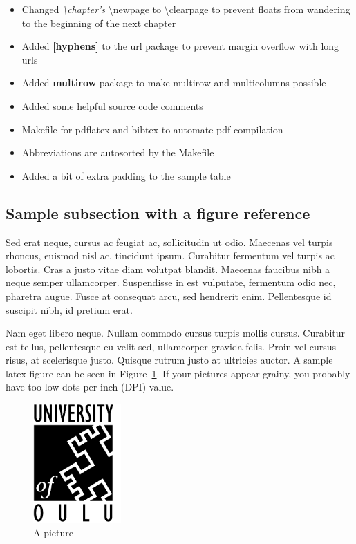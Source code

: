 \begin{itemize}
\item Changed \textit{\textbackslash{chapter's}} \textbackslash{newpage} to 
\textbackslash{clearpage} to prevent floats from wandering to the beginning of the next chapter

\item Added \textbf{[hyphens]} to the url package to prevent margin overflow with 
long urls

\item Added \textbf{multirow} package to make multirow and multicolumns possible

\item Added some helpful source code comments

\item Makefile for pdflatex and bibtex to automate pdf compilation

\item Abbreviations are autosorted by the Makefile

\item Added a bit of extra padding to the sample table
\end{itemize}

\subsection{Sample subsection with a figure reference}

Sed erat neque, cursus ac feugiat ac, sollicitudin
ut odio. Maecenas vel turpis rhoncus, euismod nisl ac, tincidunt ipsum. Curabitur fermentum vel
turpis ac lobortis. Cras a justo vitae diam volutpat blandit. Maecenas faucibus nibh a neque 
semper ullamcorper. Suspendisse in est vulputate, fermentum odio nec, pharetra augue. Fusce at
consequat arcu, sed hendrerit enim. Pellentesque id suscipit nibh, id pretium erat. 

Nam eget libero neque. Nullam commodo cursus turpis mollis cursus. Curabitur est tellus,
pellentesque eu velit sed, ullamcorper gravida felis. Proin vel cursus risus, at scelerisque 
justo. Quisque rutrum justo at ultricies auctor. A sample latex figure can be seen in
Figure~\ref{fig:oylogoe}. If your pictures appear grainy, you probably have too low dots
per inch (DPI) value.


\begin{figure}[ht]
  \begin{center}
    \includegraphics*[width=0.3\textwidth]{oylogoe}
  \end{center}
  \caption{A picture}
  \label{fig:oylogoe}
\end{figure}

